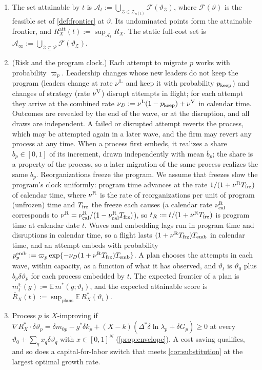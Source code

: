 \begin{definition}\label{def:attainable}
\begin{enumerate}
\item[(a)] The set attainable by $t$ is $\mathcal A_t:=\bigcup_{\mathcal Z\in\mathcal Z_{n(t)}}\mathcal F(\vartheta_{\mathcal Z})$, where $\mathcal F(\vartheta)$ is the feasible set of \autoref{def:frontier} at $\vartheta$. Its undominated points form the attainable frontier, and $R^{\mathrm{att}}_X(t):=\sup_{\mathcal A_t}R_X$. The static full-cost set is $\mathcal A_\infty:=\bigcup_{\mathcal Z\subseteq\mathcal P}\mathcal F(\vartheta_{\mathcal Z})$.
\item[(b)] (Risk and the program clock.) Each attempt to migrate $p$ works with probability $\varpi_p$. Leadership changes whose new leaders do not keep the program (leaders change at rate $\nu^{\rm L}$ and keep it with probability $p_{\rm keep}$) and changes of strategy (rate $\nu^{\rm V}$) disrupt attempts in flight; for each attempt they arrive at the combined rate $\nu_D:=\nu^{\rm L}(1-p_{\rm keep})+\nu^{\rm V}$ in calendar time. Outcomes are revealed by the end of the wave, or at the disruption, and all draws are independent. A failed or disrupted attempt reverts the process, which may be attempted again in a later wave, and the firm may revert any process at any time. When a process first embeds, it realizes a share $b_p\in[0,1]$ of its increment, drawn independently with mean $\bar b_p$; the share is a property of the process, so a later migration of the same process realizes the same $b_p$. Reorganizations freeze the program. We assume that freezes slow the program's clock uniformly: program time advances at the rate $1/(1+\nu^{\rm R}T_{\rm frz})$ of calendar time, where $\nu^{\rm R}$ is the rate of reorganizations per unit of program (unfrozen) time and $T_{\rm frz}$ the freeze each causes (a calendar rate $\nu^{\rm R}_{\rm cal}$ corresponds to $\nu^{\rm R}=\nu^{\rm R}_{\rm cal}/(1-\nu^{\rm R}_{\rm cal}T_{\rm frz})$), so $t_R:=t/(1+\nu^{\rm R}T_{\rm frz})$ is program time at calendar date $t$. Waves and embedding lags run in program time and disruptions in calendar time, so a flight lasts $(1+\nu^{\rm R}T_{\rm frz})T_{\mathrm{emb}}$ in calendar time, and an attempt embeds with probability $p^{\rm emb}_p:=\varpi_p\exp\{-\nu_D(1+\nu^{\rm R}T_{\rm frz})T_{\mathrm{emb}}\}$. A plan chooses the attempts in each wave, within capacity, as a function of what it has observed, and $\vartheta_t$ is $\vartheta_0$ plus $b_p\delta\vartheta_p$ for each process embedded by $t$. The expected frontier of a plan is $m^{\mathbb E}_t(g):=\mathbb E\,m^*(g;\vartheta_t)$, and the expected attainable score is $\bar R_X(t):=\sup_{\text{plans}}\mathbb E\,R^*_X(\vartheta_t)$.
\item[(c)] Process $p$ is $X$-improving if $\nabla R^*_X\cdot\delta\vartheta_p=\delta m_{0p}-g^*\delta k_p+(X-k)(\Delta^*\delta\ln\lambda_p+\delta G_p)\ge0$ at every $\vartheta_0+\sum_qx_q\delta\vartheta_q$ with $x\in[0,1]^N$ (\autoref{prop:envelope}). A cost saving qualifies, and so does a capital-for-labor switch that meets \autoref{cor:substitution} at the largest optimal growth rate.
\end{enumerate}
\end{definition}

